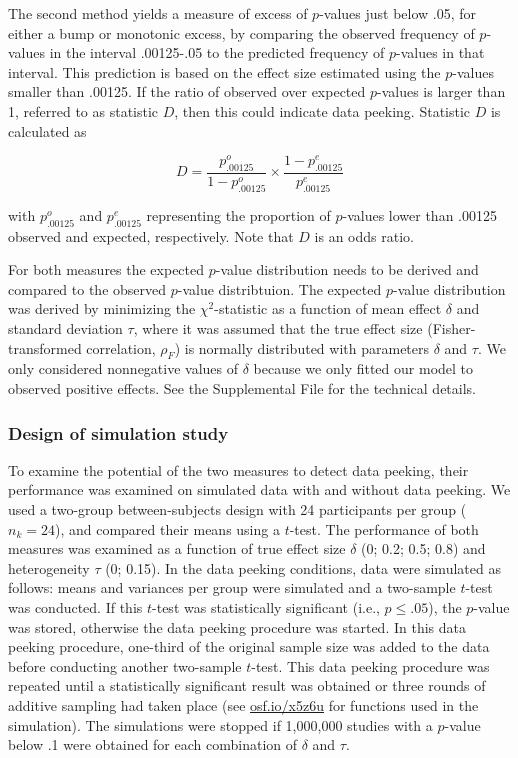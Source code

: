 \documentclass[a5paper]{book}
\begin{document}
The second method yields a measure of excess of \(p\)-values just below
.05, for either a bump or monotonic excess, by comparing the observed
frequency of \(p\)-values in the interval .00125-.05 to the predicted
frequency of \(p\)-values in that interval. This prediction is based on
the effect size estimated using the \(p\)-values smaller than .00125. If
the ratio of observed over expected \(p\)-values is larger than 1,
referred to as statistic \(D\), then this could indicate data peeking.
Statistic \(D\) is calculated as

\begin{equation}
D=\frac{p^o_{.00125}}{1-p^o_{.00125}}\times\frac{1-p^e_{.00125}}{p^e_{.00125}}
\label{eq:bump-d}
\end{equation}

with \(p^o_{.00125}\) and \(p^e_{.00125}\) representing the proportion
of \(p\)-values lower than .00125 observed and expected, respectively.
Note that \(D\) is an odds ratio.

For both measures the expected \(p\)-value distribution needs to be
derived and compared to the observed \(p\)-value distribtuion. The
expected \(p\)-value distribution was derived by minimizing the
\(\chi^2\)-statistic as a function of mean effect \(\delta\) and
standard deviation \(\tau\), where it was assumed that the true effect
size (Fisher-transformed correlation, \(\rho_F\)) is normally
distributed with parameters \(\delta\) and \(\tau\). We only considered
nonnegative values of \(\delta\) because we only fitted our model to
observed positive effects. See the Supplemental File for the technical
details.

\subsubsection{Design of simulation
study}\label{design-of-simulation-study}

To examine the potential of the two measures to detect data peeking,
their performance was examined on simulated data with and without data
peeking. We used a two-group between-subjects design with 24
participants per group (\(n_k=24\)), and compared their means using a
\(t\)-test. The performance of both measures was examined as a function
of true effect size \(\delta\) (0; 0.2; 0.5; 0.8) and heterogeneity
\(\tau\) (0; 0.15). In the data peeking conditions, data were simulated
as follows: means and variances per group were simulated and a
two-sample \(t\)-test was conducted. If this \(t\)-test was
statistically significant (i.e., \(p\leq.05\)), the \(p\)-value was
stored, otherwise the data peeking procedure was started. In this data
peeking procedure, one-third of the original sample size was added to
the data before conducting another two-sample \(t\)-test. This data
peeking procedure was repeated until a statistically significant result
was obtained or three rounds of additive sampling had taken place (see
\href{https://osf.io/x5z6u}{osf.io/x5z6u} for functions used in the
simulation). The simulations were stopped if 1,000,000 studies with a
\(p\)-value below .1 were obtained for each combination of \(\delta\)
and \(\tau\).
\end{document}
